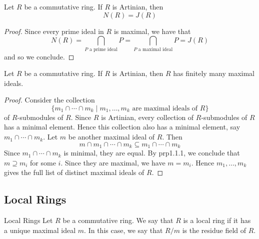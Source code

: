 \documentclass[a4paper]{article}
\begin{document}
\begin{prp}{}{} Let $R$ be a commutative ring. If $R$ is Artinian, then $$N(R)=J(R)$$ \tcbline
\begin{proof}
Since every prime ideal in $R$ is maximal, we have that $$N(R)=\bigcap_{P\text{ a prime ideal}}P=\bigcap_{P\text{ a maximal ideal}}P=J(R)$$ and so we conclude. 
\end{proof}
\end{prp}

\begin{prp}{}{} Let $R$ be a commutative ring. If $R$ is Artinian, then $R$ has finitely many maximal ideals. \tcbline
\begin{proof}
Consider the collection $$\{m_1\cap\cdots\cap m_k\;|\;m_1,\dots,m_k\text{ are maximal ideals of }R\}$$ of $R$-submodules of $R$. Since $R$ is Artinian, every collection of $R$-submodules of $R$ has a minimal element. Hence this collection also has a minimal element, say $m_1\cap\cdots\cap m_k$. Let $m$ be another maximal ideal of $R$. Then $$m\cap m_1\cap\cdots\cap m_k\subseteq m_1\cap\cdots\cap m_k$$ Since $m_1\cap\cdots\cap m_k$ is minimal, they are equal. By prp1.1.1, we conclude that $m\supseteq m_i$ for some $i$. Since they are maximal, we have $m=m_i$. Hence $m_1,\dots,m_k$ gives the full list of distinct maximal ideals of $R$. 
\end{proof}
\end{prp}

\subsection{Local Rings}
\begin{defn}{Local Rings}{} Let $R$ be a commutative ring. We say that $R$ is a local ring if it has a unique maximal ideal $m$. In this case, we say that $R/m$ is the residue field of $R$. 
\end{defn}
\end{document}
